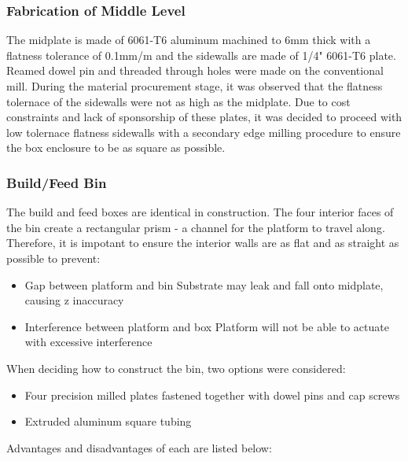 \documentclass[11pt]{article}
\begin{document}
\subsubsection {Fabrication of Middle Level}
The midplate is made of 6061-T6 aluminum machined to 6mm thick with a flatness tolerance of 0.1mm/m and the sidewalls are made of 1/4" 6061-T6 plate. Reamed dowel pin and threaded through holes were made on the conventional mill. During the material procurement stage, it was observed that the flatness tolernace of the sidewalls were not as high as the midplate. Due to cost constraints and lack of sponsorship of these plates, it was decided to proceed with low tolernace flatness sidewalls with a secondary edge milling procedure to ensure the box enclosure to be as square as possible.
\subsubsection {Build/Feed Bin}
The build and feed boxes are identical in construction. The four interior faces of the bin create a rectangular prism - a channel for the platform to travel along. Therefore, it is impotant to ensure the interior walls are as flat and as straight as possible to prevent:
\begin{itemize}
\item Gap between platform and bin
Substrate may leak and fall onto midplate, causing z inaccuracy
\item Interference between platform and box
Platform will not be able to actuate with excessive interference 
\end{itemize}

When deciding how to construct the bin, two options were considered:
\begin{itemize}
\item Four precision milled plates fastened together with dowel pins and cap screws
\item Extruded aluminum square tubing
\end{itemize}

Advantages and disadvantages of each are listed below:
\end{document}
